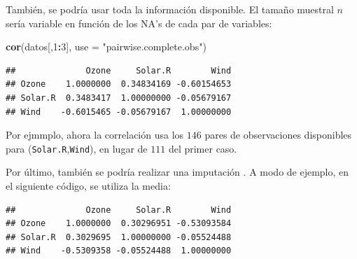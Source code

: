 \documentclass[
]{book}
\newenvironment{Shaded}{\begin{snugshade}}{\end{snugshade}}
\newcommand{\AttributeTok}[1]{\textcolor[rgb]{0.13,0.29,0.53}{#1}}
\newcommand{\DecValTok}[1]{\textcolor[rgb]{0.00,0.00,0.81}{#1}}
\newcommand{\FunctionTok}[1]{\textcolor[rgb]{0.13,0.29,0.53}{\textbf{#1}}}
\newcommand{\NormalTok}[1]{#1}
\newcommand{\OtherTok}[1]{\textcolor[rgb]{0.56,0.35,0.01}{#1}}
\newcommand{\SpecialCharTok}[1]{\textcolor[rgb]{0.81,0.36,0.00}{\textbf{#1}}}
\newcommand{\StringTok}[1]{\textcolor[rgb]{0.31,0.60,0.02}{#1}}
\begin{document}
También, se podría usar toda la información disponible. El tamaño muestral \(n\) sería variable en función de los NA's de cada par de variables:

\begin{Shaded}
\begin{Highlighting}[]
\FunctionTok{cor}\NormalTok{(datos[,}\DecValTok{1}\SpecialCharTok{:}\DecValTok{3}\NormalTok{], }\AttributeTok{use =} \StringTok{"pairwise.complete.obs"}\NormalTok{)}
\end{Highlighting}
\end{Shaded}

\begin{verbatim}
##              Ozone     Solar.R        Wind
## Ozone    1.0000000  0.34834169 -0.60154653
## Solar.R  0.3483417  1.00000000 -0.05679167
## Wind    -0.6015465 -0.05679167  1.00000000
\end{verbatim}

Por ejmmplo, ahora la correlación usa los \(146\) pares de observaciones disponibles para (\texttt{Solar.R},\texttt{Wind}), en lugar de \(111\) del primer caso.

Por último, también se podría realizar una imputación \citep{van2018flexible}. A modo de ejemplo, en el siguiente código, se utiliza la media:

\begin{Shaded}
\end{Shaded}

\begin{verbatim}
##              Ozone     Solar.R        Wind
## Ozone    1.0000000  0.30296951 -0.53093584
## Solar.R  0.3029695  1.00000000 -0.05524488
## Wind    -0.5309358 -0.05524488  1.00000000
\end{verbatim}
\end{document}
